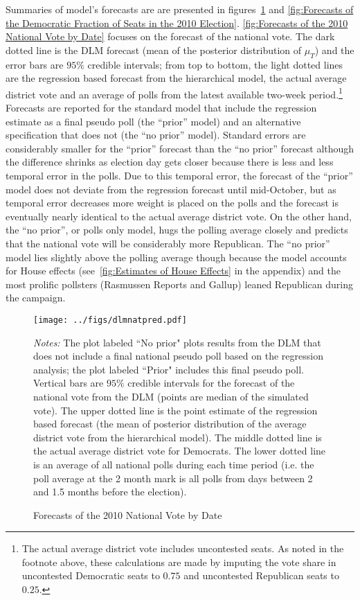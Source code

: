 \documentclass[12pt,final,fleqn]{article}
\theoremstyle{plain}
\begin{document}
Summaries of model's forecasts are are presented in figures~\ref{fig:Forecasts of the 2010 National Vote by Date} and \ref{fig:Forecasts of the Democratic Fraction of Seats in the 2010 Election}. \autoref{fig:Forecasts of the 2010 National Vote by Date} focuses on the forecast of the national vote. The dark dotted line is the DLM forecast (mean of the posterior distribution of $\mu_T$) and the error bars are $95\%$ credible intervals; from top to bottom, the light dotted lines are the regression based forecast from the hierarchical model, the actual average district vote and an average of polls from the latest available two-week period.\footnote{The actual average district vote includes uncontested seats. As noted in the footnote above, these calculations are made by imputing the vote share in uncontested Democratic seats to $0.75$ and uncontested Republican seats to $0.25$.} Forecasts are reported for the standard model that include the regression estimate as a final pseudo poll (the ``prior'' model) and an alternative specification that does not (the ``no prior'' model). Standard errors are considerably smaller for the ``prior'' forecast than the ``no prior'' forecast although the difference shrinks as election day gets closer because there is less and less temporal error in the polls. Due to this temporal error, the forecast of the ``prior'' model does not deviate from the regression forecast until mid-October, but as temporal error decreases more weight is placed on the polls and the forecast is eventually nearly identical to the actual average district vote. On the other hand, the ``no prior'', or polls only model, hugs the polling average closely and predicts that the national vote will be considerably more Republican. The ``no prior'' model lies slightly above the polling average though because the model accounts for House effects (see~\autoref{fig:Estimates of House Effects} in the appendix) and the most prolific pollsters (Rasmussen Reports and Gallup) leaned Republican during the campaign. 

\begin{figure}[!htb]
\centering
\texttt{[image: ../figs/dlmnatpred.pdf]}
\vspace{.5cm}
\caption{Forecasts of the 2010 National Vote by Date}
\label{fig:Forecasts of the 2010 National Vote by Date}
\begin{minipage}{\linewidth}
\footnotesize
\emph{Notes:} The plot labeled ``No prior" plots results from the DLM that does not include a final national pseudo poll based on the regression analysis; the plot labeled ``Prior" includes this final pseudo poll. Vertical bars are $95\%$ credible intervals for the forecast of the national vote from the DLM (points are median of the simulated vote). The upper dotted line is the point estimate of the regression based forecast (the mean of posterior distribution of the average district vote from the hierarchical model). The middle dotted line is the actual average district vote for Democrats. The lower dotted line is an average of all national polls during each time period (i.e. the poll average at the 2 month mark is all polls from days between 2 and 1.5 months before the election).
\end{minipage}
\end{figure}
\end{document}
